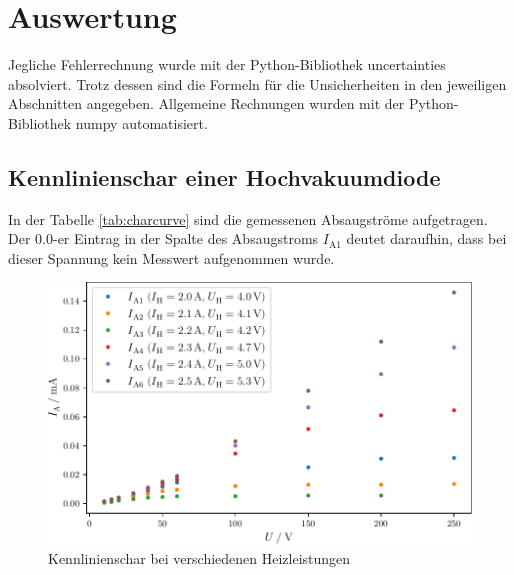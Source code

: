 \section{Auswertung}
\label{sec:Auswertung}
Jegliche Fehlerrechnung wurde mit der Python-Bibliothek uncertainties \cite{uncertainties} absolviert. Trotz dessen sind die Formeln für
die Unsicherheiten in den jeweiligen Abschnitten angegeben. Allgemeine Rechnungen wurden mit der Python-Bibliothek numpy \cite{numpy} automatisiert.
\subsection{Kennlinienschar einer Hochvakuumdiode}
In der Tabelle \ref{tab:charcurve} sind die gemessenen Absaugströme aufgetragen.
Der $0.0$-er Eintrag in der Spalte des Absaugstroms $I_{\text{A}1}$ deutet daraufhin, dass bei dieser Spannung kein Messwert aufgenommen wurde. 
\begin{figure}
    \centering
    \caption{Kennlinienschar bei verschiedenen Heizleistungen}
    \label{fig:charcurve}
    \includegraphics[width = \textwidth]{build/charcurve.pdf}
\end{figure}
